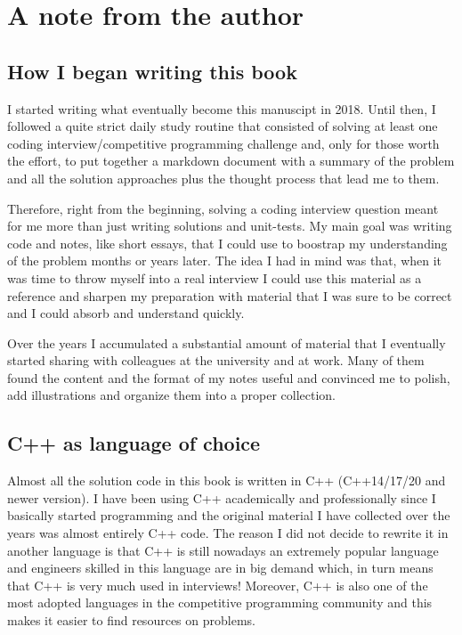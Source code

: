 \chapter*{A note from the author}

\section*{How I began writing this book}
I started writing what eventually become this manuscipt in 2018. 
Until then, I followed a quite strict daily study routine that consisted of solving at least one coding interview/competitive programming challenge and, only for those worth the effort, to put together a markdown document with a summary of the problem and all the solution approaches plus the thought process that lead me to them.

Therefore, right from the beginning, solving a coding interview question meant for me more than just writing solutions and unit-tests.
My main goal was writing code and notes, like short essays, that I could use to boostrap my understanding of the problem months or years later.
The idea I had in mind was that, when it was time to throw myself into a real interview I could use this material as a reference and sharpen my preparation with material 
that I was sure to be correct and I could absorb and understand quickly.

Over the years I accumulated a substantial amount of material that I eventually started sharing with colleagues at the university and at work. 
Many of them found the content and the format of my notes useful and convinced me to polish, add illustrations and organize them into a proper collection.

\section*{C++ as language of choice}
Almost all the solution code in this book is written in C++ (C++14/17/20 and newer version). 
I have been using C++ academically and professionally since I basically started programming and the original material I have collected over the years was almost entirely C++ code. 
The reason I did not decide to rewrite it in another language is that C++ is still nowadays an extremely popular language and engineers skilled in this language are in big demand which, in turn means that C++ is very much used in interviews!
Moreover, C++ is also one of the most adopted languages in the competitive programming community and this makes it easier to find resources on problems.

